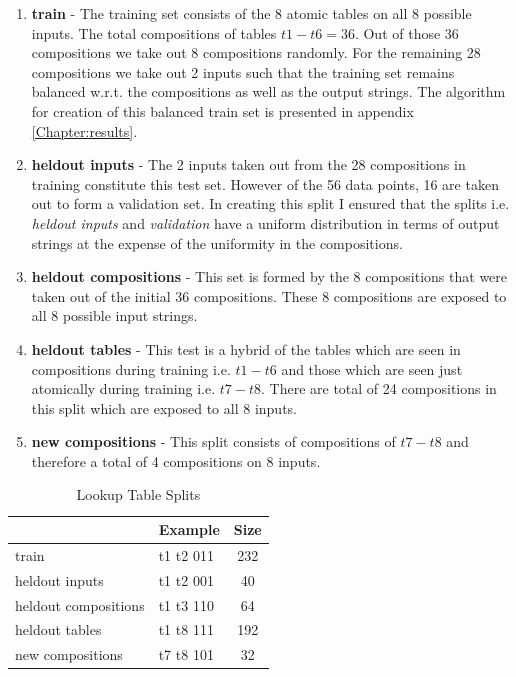 \begin{enumerate}
	\item \textbf{train} - The training set consists of the 8 atomic tables on all 8 possible inputs. The total compositions of tables $t1 - t6 = 36$. Out of those 36 compositions we take out 8 compositions randomly. For the remaining 28 compositions we take out 2 inputs such that the training set remains balanced w.r.t. the compositions as well as the output strings. The algorithm for creation of this balanced train set is presented in appendix \ref{Chapter:results}.
	\item \textbf{heldout inputs} - The 2 inputs taken out from the 28 compositions in training constitute this test set. However of the 56 data points, 16 are taken out to form a validation set. In creating this split I ensured that the splits i.e. \textit{heldout inputs} and \textit{validation} have a uniform distribution in terms of output strings at the expense of the uniformity in the compositions.
	\item \textbf{heldout compositions} - This set is formed by the 8 compositions that were taken out of the initial 36 compositions. These 8 compositions are exposed to all 8 possible input strings.
	\item \textbf{heldout tables} - This test is a hybrid of the tables which are seen in compositions during training i.e. $t1 - t6$ and those which are seen just atomically during training i.e. $t7 - t8$. There are total of 24 compositions in this split which are exposed to all 8 inputs.
	\item \textbf{new compositions} - This split consists of compositions of $t7 - t8$ and therefore a total of 4 compositions on 8 inputs.
\end{enumerate}


\begin{table}[ht]
	\centering
	\begin{tabular}{l|lc}
		& Example & Size\\
		\hline
		train & t1 t2 011 & 232 \\
		heldout inputs & t1 t2 001 & 40 \\
		heldout compositions & t1 t3 110 & 64 \\
		heldout tables & t1 t8 111 & 192 \\
		new compositions & t7 t8 101 & 32 \\
	\end{tabular}
	\caption{Lookup Table Splits}
	\label{lt:stats}
\end{table}


